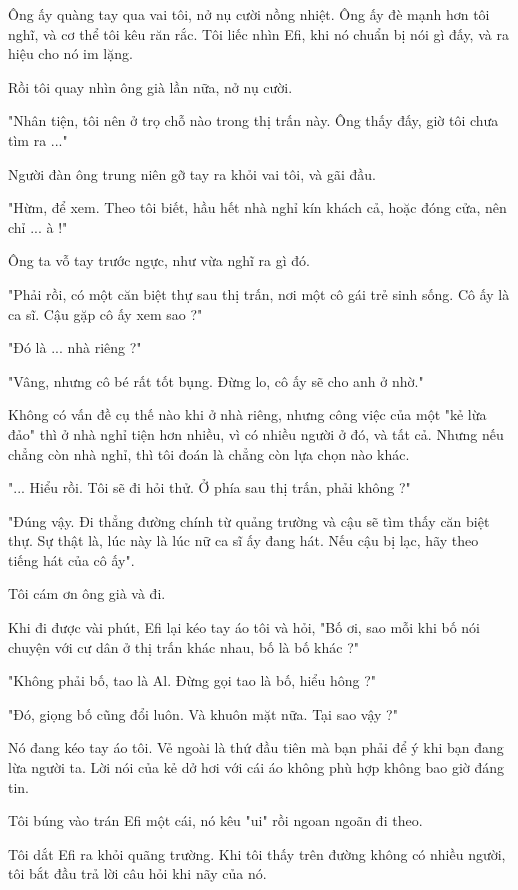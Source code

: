 Ông ấy quàng tay qua vai tôi, nở nụ cười nồng nhiệt. Ông ấy đè mạnh hơn tôi nghĩ, và cơ thể tôi kêu răn rắc. Tôi liếc nhìn Efi, khi nó chuẩn bị nói gì đấy, và ra hiệu cho nó im lặng.

Rồi tôi quay nhìn ông già lần nữa, nở nụ cười.

"Nhân tiện, tôi nên ở trọ chỗ nào trong thị trấn này. Ông thấy đấy, giờ tôi chưa tìm ra ..."

Người đàn ông trung niên gỡ tay ra khỏi vai tôi, và gãi đầu.

"Hừm, để xem. Theo tôi biết, hầu hết nhà nghỉ kín khách cả, hoặc đóng cửa, nên chỉ ... à !"

Ông ta vỗ tay trước ngực, như vừa nghĩ ra gì đó.

"Phải rồi, có một căn biệt thự sau thị trấn, nơi một cô gái trẻ sinh sống. Cô ấy là ca sĩ. Cậu gặp cô ấy xem sao ?"

"Đó là ... nhà riêng ?"

"Vâng, nhưng cô bé rất tốt bụng. Đừng lo, cô ấy sẽ cho anh ở nhờ."

Không có vấn đề cụ thế nào khi ở nhà riêng, nhưng công việc của một "kẻ lừa đảo" thì ở nhà nghỉ tiện hơn nhiều, vì có nhiều người ở đó, và tất cả. Nhưng nếu chẳng còn nhà nghỉ, thì tôi đoán là chẳng còn lựa chọn nào khác.

"... Hiểu rồi. Tôi sẽ đi hỏi thử. Ở phía sau thị trấn, phải không ?"

"Đúng vậy. Đi thẳng đường chính từ quảng trường và cậu sẽ tìm thấy căn biệt thự. Sự thật là, lúc này là lúc nữ ca sĩ ấy đang hát. Nếu cậu bị lạc, hãy theo tiếng hát của cô ấy".

Tôi cám ơn ông già và đi.

Khi đi được vài phút, Efi lại kéo tay áo tôi và hỏi, "Bố ơi, sao mỗi khi bố nói chuyện với cư dân ở thị trấn khác nhau, bố là bố khác ?"

"Không phải bố, tao là Al. Đừng gọi tao là bố, hiểu hông ?"

"Đó, giọng bố cũng đổi luôn. Và khuôn mặt nữa. Tại sao vậy ?"

Nó đang kéo tay áo tôi. Vẻ ngoài là thứ đầu tiên mà bạn phải để ý khi bạn đang lừa người ta. Lời nói của kẻ dở hơi với cái áo không phù hợp không bao giờ đáng tin.

Tôi búng vào trán Efi một cái, nó kêu "ui" rồi ngoan ngoãn đi theo.

Tôi dắt Efi ra khỏi quãng trường. Khi tôi thấy trên đường không có nhiều người, tôi bắt đầu trả lời câu hỏi khi nãy của nó. 

